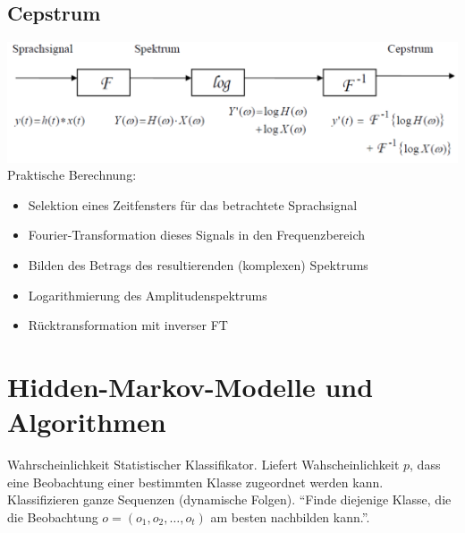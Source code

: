 \documentclass[german,color,6pt]{latex4ei/latex4ei_sheet}
\begin{document}
\begin{sectionbox}
	\subsection{Cepstrum}
	\includegraphics[width=\textwidth]{cepstrum}
	Praktische Berechnung:
	\begin{itemize}
		\item Selektion eines Zeitfensters für das betrachtete Sprachsignal
		\item Fourier-Transformation dieses Signals in den Frequenzbereich
		\item Bilden des Betrags des resultierenden (komplexen) Spektrums
		\item Logarithmierung des Amplitudenspektrums
		\item Rücktransformation mit inverser FT
	\end{itemize}

\end{sectionbox}

\columnbreak

\section{Hidden-Markov-Modelle und Algorithmen}
\begin{symbolbox}Wahrscheinlichkeit
Statistischer Klassifikator. Liefert Wahscheinlichkeit $p$, dass eine Beobachtung einer bestimmten Klasse zugeordnet werden kann. Klassifizieren ganze Sequenzen (dynamische Folgen). "`Finde diejenige Klasse, die die Beobachtung $o=(o_1, o_2, \dots , o_t)$ am besten nachbilden kann."'.
\end{symbolbox}
\end{document}
